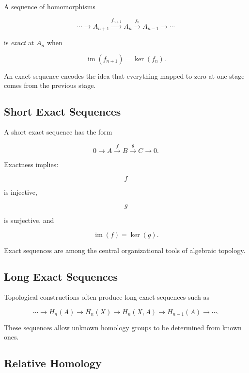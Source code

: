 A sequence of homomorphisms

\[
\cdots
\longrightarrow
A_{n+1}
\xrightarrow{f_{n+1}}
A_n
\xrightarrow{f_n}
A_{n-1}
\longrightarrow
\cdots
\]

is \emph{exact} at \(A_n\) when

\[
\boxed{
\operatorname{im}(f_{n+1})
=
\ker(f_n).
}
\]

An exact sequence encodes the idea that everything mapped to zero at one
stage comes from the previous stage.

\subsection{Short Exact Sequences}
\label{subsec:short-exact-sequences-topology}

A short exact sequence has the form

\[
\boxed{
0
\longrightarrow
A
\xrightarrow{f}
B
\xrightarrow{g}
C
\longrightarrow
0.
}
\]

Exactness implies:

\[
f
\]

is injective,

\[
g
\]

is surjective, and

\[
\boxed{
\operatorname{im}(f)
=
\ker(g).
}
\]

Exact sequences are among the central organizational tools of algebraic
topology.

\subsection{Long Exact Sequences}
\label{subsec:long-exact-sequences-topology}

Topological constructions often produce long exact sequences such as

\[
\cdots
\to
H_n(A)
\to
H_n(X)
\to
H_n(X,A)
\to
H_{n-1}(A)
\to
\cdots.
\]

These sequences allow unknown homology groups to be determined from known
ones.

\subsection{Relative Homology}
\label{subsec:relative-homology}

